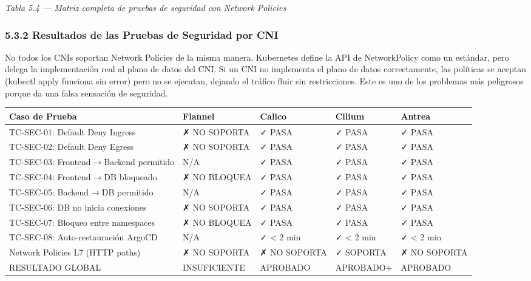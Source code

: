 \documentclass[journal]{IEEEtran}
\begin{document}
\begin{center}\emph{\emph{Tabla 5.4 --- Matriz completa de pruebas de seguridad con Network Policies}}\end{center}

\subsubsection{5.3.2 Resultados de las Pruebas de Seguridad por CNI}

No todos los CNIs soportan Network Policies de la misma manera. Kubernetes define la API de NetworkPolicy como un estándar, pero delega la implementación real al plano de datos del CNI. Si un CNI no implementa el plano de datos correctamente, las políticas se aceptan (kubectl apply funciona sin error) pero no se ejecutan, dejando el tráfico fluir sin restricciones. Este es uno de los problemas más peligrosos porque da una falsa sensación de seguridad.

\begin{table}[htbp]
\centering
\scriptsize
\begin{tabularx}{\textwidth}{|Y|Y|Y|Y|Y|}
\hline
\textbf{Caso de Prueba} & \textbf{Flannel} & \textbf{Calico} & \textbf{Cilium} & \textbf{Antrea} \\
\hline
TC-SEC-01: Default Deny Ingress & ✗ NO SOPORTA & ✓ PASA & ✓ PASA & ✓ PASA \\
TC-SEC-02: Default Deny Egress & ✗ NO SOPORTA & ✓ PASA & ✓ PASA & ✓ PASA \\
TC-SEC-03: Frontend$\rightarrow$Backend permitido & N/A & ✓ PASA & ✓ PASA & ✓ PASA \\
TC-SEC-04: Frontend$\rightarrow$DB bloqueado & ✗ NO BLOQUEA & ✓ PASA & ✓ PASA & ✓ PASA \\
TC-SEC-05: Backend$\rightarrow$DB permitido & N/A & ✓ PASA & ✓ PASA & ✓ PASA \\
TC-SEC-06: DB no inicia conexiones & ✗ NO SOPORTA & ✓ PASA & ✓ PASA & ✓ PASA \\
TC-SEC-07: Bloqueo entre namespaces & ✗ NO BLOQUEA & ✓ PASA & ✓ PASA & ✓ PASA \\
TC-SEC-08: Auto-restauración ArgoCD & N/A & ✓ < 2 min & ✓ < 2 min & ✓ < 2 min \\
Network Policies L7 (HTTP paths) & ✗ NO SOPORTA & ✗ NO SOPORTA & ✓ SOPORTA & ✗ NO SOPORTA \\
RESULTADO GLOBAL & INSUFICIENTE & APROBADO & APROBADO+ & APROBADO \\
\hline
\end{tabularx}
\end{table}
\end{document}
